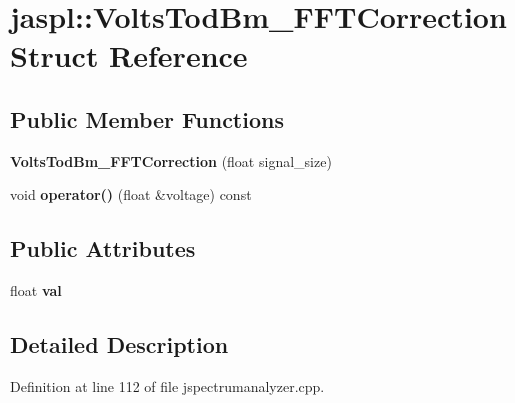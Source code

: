\hypertarget{structjaspl_1_1_volts_tod_bm___f_f_t_correction}{}\section{jaspl\+:\+:Volts\+Tod\+Bm\+\_\+\+F\+F\+T\+Correction Struct Reference}
\label{structjaspl_1_1_volts_tod_bm___f_f_t_correction}
\subsection*{Public Member Functions}
\begin{DoxyCompactItemize}
\item 
{\bfseries Volts\+Tod\+Bm\+\_\+\+F\+F\+T\+Correction} (float signal\+\_\+size)\hypertarget{structjaspl_1_1_volts_tod_bm___f_f_t_correction_a23dc2b20021d0be380a30c7367e5b057}{}\label{structjaspl_1_1_volts_tod_bm___f_f_t_correction_a23dc2b20021d0be380a30c7367e5b057}

\item 
void {\bfseries operator()} (float \&voltage) const \hypertarget{structjaspl_1_1_volts_tod_bm___f_f_t_correction_a4a1e9effceff88b115d9e4b7b5563c1b}{}\label{structjaspl_1_1_volts_tod_bm___f_f_t_correction_a4a1e9effceff88b115d9e4b7b5563c1b}

\end{DoxyCompactItemize}
\subsection*{Public Attributes}
\begin{DoxyCompactItemize}
\item 
float {\bfseries val}\hypertarget{structjaspl_1_1_volts_tod_bm___f_f_t_correction_a90077ccbd2279cee79e286c28684f8dd}{}\label{structjaspl_1_1_volts_tod_bm___f_f_t_correction_a90077ccbd2279cee79e286c28684f8dd}

\end{DoxyCompactItemize}


\subsection{Detailed Description}


Definition at line 112 of file jspectrumanalyzer.\+cpp.


